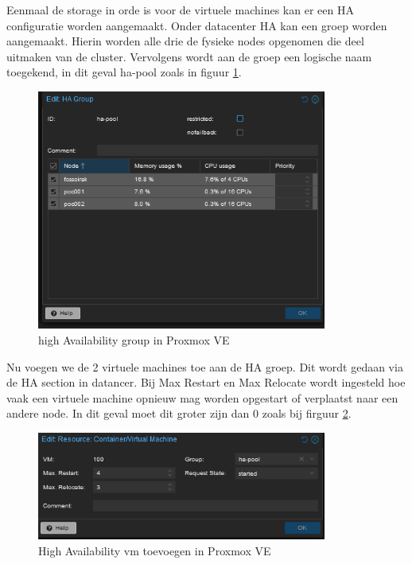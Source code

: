 Eenmaal de storage in orde is voor de virtuele machines kan er een HA configuratie worden aangemaakt. 
Onder datacenter HA kan een groep worden aangemaakt. Hierin worden alle drie de fysieke nodes opgenomen die deel uitmaken van de cluster. Vervolgens wordt aan de groep een logische naam toegekend, in dit geval ha-pool zoals in figuur \ref{fig:ha-group}.
\begin{figure}[H]
  \centering
  \includegraphics[width=0.85\textwidth]{../poc/ha-group.png}
  \caption{high Availability group in Proxmox VE}
  \label{fig:ha-group}
\end{figure}
Nu voegen we de 2 virtuele machines toe aan de HA groep. Dit wordt gedaan via de HA section in datancer.
Bij Max Restart en Max Relocate wordt ingesteld hoe vaak een virtuele machine opnieuw mag worden opgestart of verplaatst naar een andere node. In dit geval moet dit groter zijn dan 0 zoals bij firguur \ref{fig:ha-vm}.
\begin{figure}[H]
  \centering
  \includegraphics[width=0.85\textwidth]{../poc/vm-ha.png}
  \caption{High Availability vm toevoegen in Proxmox VE}
  \label{fig:ha-vm}
\end{figure}




